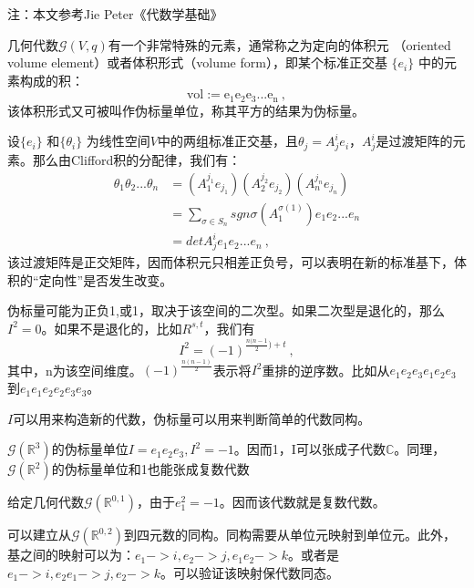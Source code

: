 
注：本文参考Jie Peter《代数学基础》

几何代数$\mathcal G(V,q)$有一个非常特殊的元素，通常称之为定向的体积元
（oriented volume element）或者体积形式（volume form），即某个标准正交基 $\{e_i\}$ 中的元素构成的积：
$$\mathrm {vol:=e_1e_2e_3...e_n}~,$$
该体积形式又可被叫作伪标量单位，称其平方的结果为伪标量。

设$\{e_i\}$ 和$\{\theta_i\}$ 为线性空间$V$中的两组标准正交基，且$\theta_j=A^i_j e_i$，$A^i_j$是过渡矩阵的元素。那么由Clifford积的分配律，我们有：
\begin{equation}
\begin{aligned}
\theta_1\theta_2...\theta_n&=(A^{j_1}_1 e_{j_1})(A^{j_2}_2 e_{j_2})(A^{j_n}_n e_{j_n})\\
&=\sum_{\sigma\in S_n} sgn\sigma(A^{\sigma (1)}_1)e_1e_2...e_n\\
&=det A^i_je_1e_2...e_n~,
\end{aligned}
\end{equation}
该过渡矩阵是正交矩阵，因而体积元只相差正负号，可以表明在新的标准基下，体积的“定向性”是否发生改变。

伪标量可能为正负1,或1，取决于该空间的二次型。如果二次型是退化的，那么$I^2=0$。如果不是退化的，比如$R^{s,t}$，我们有
\begin{equation}
I^2=(-1)^{\frac{n(n-1}{2})+t}~,
\end{equation}
其中，n为该空间维度。$(-1)^{\frac{n(n-1)}{2}}$表示将$I^2$重排的逆序数。比如从$e_1e_2e_3e_1e_2e_3$到$e_1e_1e_2e_2e_3e_3$。

$I$可以用来构造新的代数，伪标量可以用来判断简单的代数同构。

\begin{example}{}
$\mathcal G(\mathbb R^3)$的伪标量单位$I=e_1e_2e_3,I^2=-1$。因而{1，I}可以张成子代数$\mathbb C$。同理，$\mathcal G(\mathbb R^2)$的伪标量单位和1也能张成复数代数
\end{example}
\begin{example}{}
给定几何代数$\mathcal G(\mathbb R^{0,1})$，由于$e_1^2=-1$。因而该代数就是复数代数。
\end{example}
\begin{example}{}
可以建立从$\mathcal G(\mathbb R^{0,2})$到四元数的同构。同构需要从单位元映射到单位元。此外，基之间的映射可以为：$e_1->i,e_2->j,e_1e_2->k$。或者是$e_1->i,e_2 e_1->j,e_2->k$。可以验证该映射保代数同态。
\end{example}
